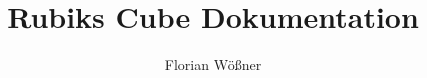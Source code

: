 \documentclass[envcountsame, envcountchap, deutsch]{i-studis}
\begin{document}
\title{Rubiks Cube Dokumentation}

\author{Florian Wößner}


\address{Trier}


\mytitlepage

\frontmatter
\tableofcontents										%


\mainmatter





\backmatter


\begin{appendix}
\end{appendix}
\end{document}

